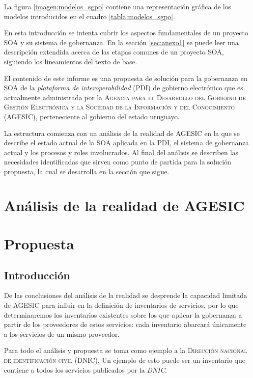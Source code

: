 \documentclass[11pt]{article}
\begin{document}
			La figura \ref{imagen:modelos_sgpo} contiene una representación gráfica de los modelos introducidos en el cuadro \ref{tabla:modelos_sgpo}.

			En esta introducción se intenta cubrir los aspectos fundamentales de un proyecto SOA y su sistema de gobernanza. En la sección \ref{sec:anexo1} se puede leer una descripción extendida acerca de las etapas comunes de un proyecto SOA, siguiendo los lineamientos del texto de base.


			El contenido de este informe es una propuesta de solución para la gobernanza en SOA de la \emph{plataforma de interoperabilidad} (PDI) de gobierno electrónico que es actualmente administrada por la \textsc{Agencia para el Desarrollo del Gobierno de Gestión Electrónica y la Sociedad de la Información y del Conocimiento (AGESIC)}, perteneciente al gobierno del estado uruguayo.

			La estructura comienza con un análisis de la realidad de AGESIC en la que se describe el estado actual de la SOA aplicada en la PDI, el sistema de gobernanza actual y los procesos y roles involucrados. Al final del análisis se describen las necesidades identificadas que sirven como punto de partida para la solución propuesta, la cual se desarrolla en la sección que sigue. %

	\section{Análisis de la realidad de AGESIC}

	\section{Propuesta}
		\subsection{Introducción}
			De las conclusiones del análisis de la realidad se desprende la capacidad limitada de AGESIC para influir en la definición de inventarios de servicios, por lo que determinaremos los inventarios existentes sobre los que aplicar la gobernanza a partir de los proveedores de estos servicios: cada inventario abarcará únicamente a los servicios de un mismo proveedor.

			Para todo el análisis y propuesta se toma como ejemplo a la \textsc{Dirección nacional de identificación civil (DNIC)}.
			Un ejemplo de esto puede ser un inventario que contiene a todos los servicios publicados por la \emph{DNIC}.
\end{document}
